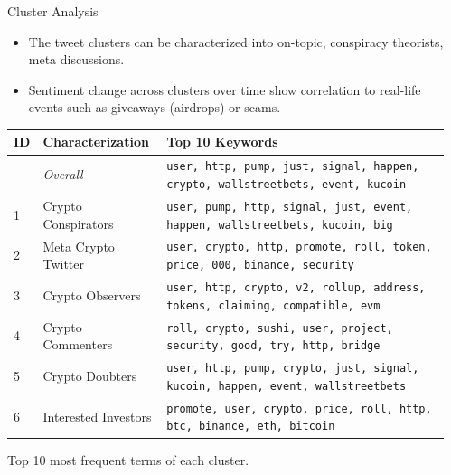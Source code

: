 \documentclass[final]{beamer}
\begin{document}
\begin{frame}[t]
\begin{columns}[t]
\begin{column}{0.73\paperwidth}
\begin{block}{Cluster Analysis}
\begin{minipage}[t]{0.76\textwidth}
{\begin{itemize}
							\item The tweet clusters can be characterized into on-topic, conspiracy theorists, meta discussions.
							\item Sentiment change across clusters over time show correlation to real-life events such as giveaways (airdrops) or scams.
						\end{itemize}
					}
          \vspace{1.4em}
					\begin{table}
						\centering
						{\small
							\begin{tabular}[c]{lll}
								\toprule
								\textbf{ID} & \textbf{Characterization} & \textbf{Top 10 Keywords}                                                               \\ \midrule
								            & \emph{Overall}            & \texttt{user, http, pump, just, signal, happen, crypto, wallstreetbets, event, kucoin} \\
								1           & Crypto Conspirators       & \texttt{user, pump, http, signal, just, event, happen, wallstreetbets, kucoin, big}    \\
								2           & Meta Crypto Twitter       & \texttt{user, crypto, http, promote, roll, token, price, 000, binance, security}       \\
								3           & Crypto Observers          & \texttt{user, http, crypto, v2, rollup, address, tokens, claiming, compatible, evm}    \\
								4           & Crypto Commenters         & \texttt{roll, crypto, sushi, user, project, security, good, try, http, bridge}         \\
								5           & Crypto Doubters           & \texttt{user, http, pump, crypto, just, signal, kucoin, happen, event, wallstreetbets} \\
								6           & Interested Investors      & \texttt{promote, user, crypto, price, roll, http, btc, binance, eth, bitcoin}          \\
								\bottomrule
							\end{tabular}
						}
					\end{table}
					\vspace{1.07em}
					{\color{rpi_darkgray} \small Top 10 most frequent terms of each cluster.}
				\end{minipage}%
			\end{block}
		\end{column}
		\begin{column}{0.01\paperwidth}\end{column}

\end{columns}
\end{frame}
\end{document}
